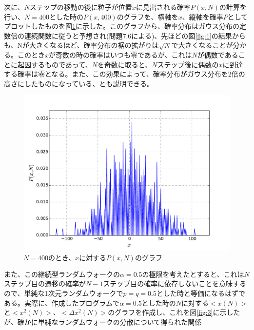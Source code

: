 \documentclass{jsarticle}
\begin{document}
\begin{enumerate}
\begin{enumerate}
                    次に、$N$ステップの移動の後に粒子が位置$x$に見出される確率$P(x,N)$の計算を行い、$N=400$とした時の$P(x,400)$のグラフを、横軸を$x$、縦軸を確率$P$としてプロットしたものを図\ref{fig:2}に示した。このグラフから、確率分布はガウス分布の定数倍の連続関数に従うと予想され(問題7.6による)、先ほどの図\ref{fig:1}の結果からも、Nが大きくなるほど、確率分布の裾の拡がりは$\sqrt N$で大きくなることが分かる。このとき$x$が奇数の時の確率はいつも零であるが、これは$N$が偶数であることに起因するものであって、$N$を奇数に取ると、$N$ステップ後に偶数の$x$に到達する確率は零となる。また、この効果によって、確率分布がガウス分布を2倍の高さにしたものになっている、とも説明できる。
                    
                    \begin{figure}[H]
                        \begin{center}
                            \includegraphics[width=12.5cm]{figure_2.pdf}
                            \caption{$N=400$のとき、$x$に対する$P(x,N)$のグラフ}
                            \label{fig:2}
                        \end{center}
                    \end{figure}
                    
                    また、この継続型ランダムウォークの$\alpha=0.5$の極限を考えたとすると、これは$N$ステップ目の遷移の確率が$N-1$ステップ目の確率に依存しないことを意味するので、単純な1次元ランダムウォークで$p=q=0.5$とした時と等価になるはずである。実際に、作成したプログラムで$\alpha=0.5$とした時の$N$に対する$< x(N)> $と$< x^{2}(N)> $、$< \Delta x^{2}(N)> $のグラフを作成し、これを図\ref{fig:3}に示したが、確かに単純なランダムウォークの分散について得られた関係
                    

\end{enumerate}
\end{enumerate}
\end{document}
